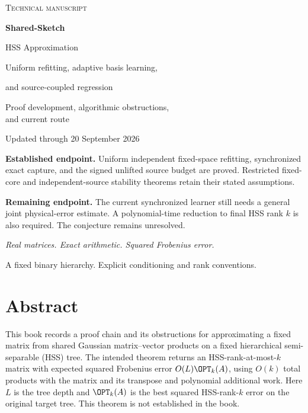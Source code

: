 \documentclass[11pt,oneside,openany,a4paper]{book}
\numberwithin{equation}{chapter}
\theoremstyle{definition}
\theoremstyle{remark}
\begin{document}
\frontmatter
\hypersetup{pageanchor=false}
\begin{titlepage}
\vspace*{10mm}
{\color{inkblue}\large\scshape Technical manuscript\par}
\vspace{15mm}
{\color{inkblue}\Huge\bfseries Shared-Sketch\par HSS Approximation\par}
\vspace{7mm}
{\LARGE Uniform refitting, adaptive basis learning,\par and source-coupled regression\par}
\vspace{11mm}
{\large Proof development, algorithmic obstructions,\\ and current route\par}
\vspace{3mm}
{\normalsize Updated through 20 September 2026\par}
\vspace{12mm}
\begin{statusbox}
\textbf{Established endpoint.} Uniform independent fixed-space refitting, synchronized exact capture, and the signed unlifted source budget are proved. Restricted fixed-core and independent-source stability theorems retain their stated assumptions.

\textbf{Remaining endpoint.} The current synchronized learner still needs a general joint physical-error estimate. A polynomial-time reduction to final HSS rank $k$ is also required. The conjecture remains unresolved.
\end{statusbox}
\vfill
{\itshape Real matrices. Exact arithmetic. Squared Frobenius error.\par
A fixed binary hierarchy. Explicit conditioning and rank conventions.}
\end{titlepage}
\setcounter{page}{1}\hypersetup{pageanchor=true}


\chapter*{Abstract}

This book records a proof chain and its obstructions for approximating a
fixed matrix from shared Gaussian matrix--vector products on a fixed
hierarchical semi-separable (HSS) tree.  The intended theorem returns an
HSS-rank-at-most-$k$ matrix with expected squared Frobenius error
$O(L)\OPT_k(A)$, using $O(k)$ total products with the matrix and its
transpose and polynomial additional work.  Here $L$ is the tree depth
and $\OPT_k(A)$ is the best squared HSS-rank-$k$ error on the original
target tree.  This theorem is not established in the book.
\end{document}
